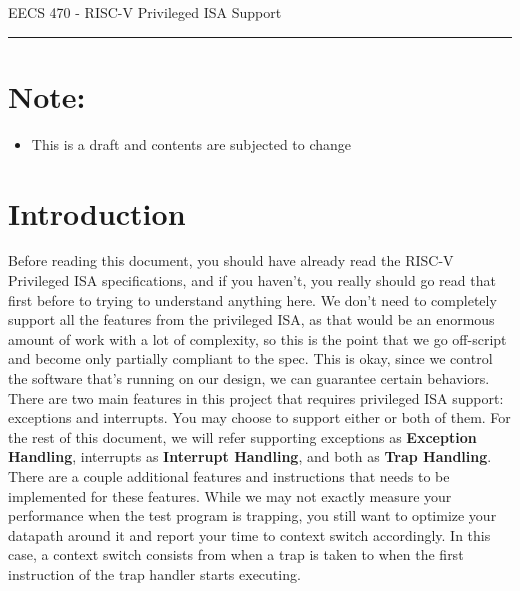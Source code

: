 \documentclass{article}
\newcommand{\shortbar}{
	\vspace*{-12pt}
	\begin{center}
		\rule{5ex}{0.1pt}
	\end{center}
}
\newcommand{\lab}[1]{
	\begin{center}
		\LARGE{
			\vspace*{-12pt}
			EECS 470 - RISC-V Privileged ISA Support
			\shortbar
		}
	\end{center}
}
\begin{document}
\vspace*{-20pt}
\lab{6}
\vspace*{-20pt}

\section*{Note:}
\begin{itemize}
	\item This is a draft and contents are subjected to change
\end{itemize}

\section{Introduction}
Before reading this document, you should have already read the RISC-V Privileged ISA specifications, and if you haven't, you really should go read that first before to trying to understand anything here. We don't need to completely support all the features from the privileged ISA, as that would be an enormous amount of work with a lot of complexity, so this is the point that we go off-script and become only partially compliant to the spec. This is okay, since we control the software that's running on our design, we can guarantee certain behaviors. There are two main features in this project that requires privileged ISA support: exceptions and interrupts. You may choose to support either or both of them. For the rest of this document, we will refer supporting exceptions as \textbf{Exception Handling}, interrupts as \textbf{Interrupt Handling}, and both as \textbf{Trap Handling}. There are a couple additional features and instructions that needs to be implemented for these features. While we may not exactly measure your performance when the test program is trapping, you still want to optimize your datapath around it and report your time to context switch accordingly. In this case, a context switch consists from when a trap is taken to when the first instruction of the trap handler starts executing.
\end{document}
